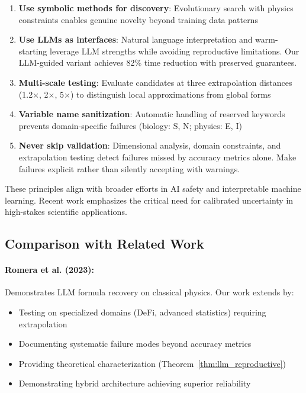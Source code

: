 \documentclass[twoside,11pt]{article}
\begin{document}
\begin{enumerate}
\item \textbf{Use symbolic methods for discovery}: Evolutionary search with physics constraints enables genuine novelty beyond training data patterns

\item \textbf{Use LLMs as interfaces}: Natural language interpretation and warm-starting leverage LLM strengths while avoiding reproductive limitations. Our LLM-guided variant achieves 82\% time reduction with preserved guarantees.

\item \textbf{Multi-scale testing}: Evaluate candidates at three extrapolation distances (1.2$\times$, 2$\times$, 5$\times$) to distinguish local approximations from global forms

\item \textbf{Variable name sanitization}: Automatic handling of reserved keywords prevents domain-specific failures (biology: S, N; physics: E, I)

\item \textbf{Never skip validation}: Dimensional analysis, domain constraints, and extrapolation testing detect failures missed by accuracy metrics alone. Make failures explicit rather than silently accepting with warnings.
\end{enumerate}

These principles align with broader efforts in AI safety and interpretable machine learning. Recent work emphasizes the critical need for calibrated uncertainty in high-stakes scientific applications.


\subsection{Comparison with Related Work}

\paragraph{Romera et al. (2023):} Demonstrates LLM formula recovery on classical physics. Our work extends by:
\begin{itemize}
\item Testing on specialized domains (DeFi, advanced statistics) requiring extrapolation
\item Documenting systematic failure modes beyond accuracy metrics
\item Providing theoretical characterization (Theorem~\ref{thm:llm_reproductive})
\item Demonstrating hybrid architecture achieving superior reliability
\end{itemize}
\end{document}
